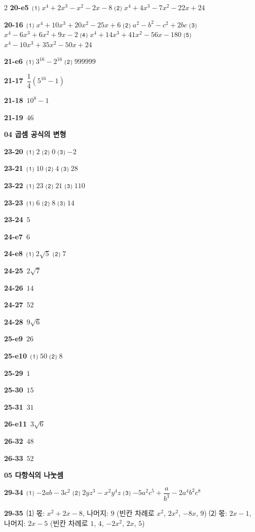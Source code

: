 \documentclass[10pt,a4paper]{article}
\begin{document}
\begin{multicols}{2}
\noindent\textbf{20-e5}\ ⑴ $x^4+2x^3-x^2-2x-8$ ⑵ $x^4+4x^3-7x^2-22x+24$\par
\noindent\textbf{20-16}\ ⑴ $x^4+10x^3+20x^2-25x+6$ ⑵ $a^2-b^2-c^2+2bc$ ⑶ $x^4-6x^3+6x^2+9x-2$ ⑷ $x^4+14x^3+41x^2-56x-180$ ⑸ $x^4-10x^3+35x^2-50x+24$\par
\noindent\textbf{21-e6}\ ⑴ $3^{16}-2^{16}$ ⑵ $999999$\par
\noindent\textbf{21-17}\ $\dfrac{1}{4}(5^{16}-1)$\par
\noindent\textbf{21-18}\ $10^8-1$\par
\noindent\textbf{21-19}\ $46$\par
\noindent\textbf{04 곱셈 공식의 변형}\par\smallskip
\noindent\textbf{23-20}\ ⑴ $2$ ⑵ $0$ ⑶ $-2$\par
\noindent\textbf{23-21}\ ⑴ $10$ ⑵ $4$ ⑶ $28$\par
\noindent\textbf{23-22}\ ⑴ $23$ ⑵ $21$ ⑶ $110$\par
\noindent\textbf{23-23}\ ⑴ $6$ ⑵ $8$ ⑶ $14$\par
\noindent\textbf{23-24}\ $5$\par
\noindent\textbf{24-e7}\ $6$\par
\noindent\textbf{24-e8}\ ⑴ $2\sqrt{5}$ ⑵ $7$\par
\noindent\textbf{24-25}\ $2\sqrt{7}$\par
\noindent\textbf{24-26}\ $14$\par
\noindent\textbf{24-27}\ $52$\par
\noindent\textbf{24-28}\ $9\sqrt{6}$\par
\noindent\textbf{25-e9}\ $26$\par
\noindent\textbf{25-e10}\ ⑴ $50$ ⑵ $8$\par
\noindent\textbf{25-29}\ $1$\par
\noindent\textbf{25-30}\ $15$\par
\noindent\textbf{25-31}\ $31$\par
\noindent\textbf{26-e11}\ $3\sqrt{6}$\par
\noindent\textbf{26-32}\ $48$\par
\noindent\textbf{26-33}\ $52$\par
\noindent\textbf{05 다항식의 나눗셈}\par\smallskip
\noindent\textbf{29-34}\ ⑴ $-2ab-3c^2$ \quad ⑵ $2yz^3-x^2y^4z$ \quad ⑶ $-5a^2c^5+\dfrac{a}{b^3}-2a^4b^2c^8$\par
\noindent\textbf{29-35}\ ⑴ 몫: $x^2+2x-8$, 나머지: $9$ (빈칸 차례로 $x^2$, $2x^2$, $-8x$, $9$) \quad ⑵ 몫: $2x-1$, 나머지: $2x-5$ (빈칸 차례로 $1$, $4$, $-2x^2$, $2x$, $5$)\par

\end{multicols}
\end{document}
